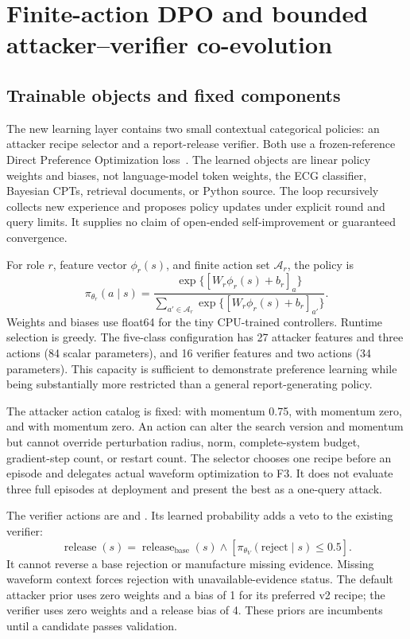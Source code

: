 \section{Finite-action DPO and bounded attacker--verifier co-evolution}
\label{sec:dpomethods}
\subsection{Trainable objects and fixed components}
The new learning layer contains two small contextual categorical policies: an attacker recipe selector and a report-release verifier. Both use a frozen-reference Direct Preference Optimization loss~\cite{dpo}. The learned objects are linear policy weights and biases, not language-model token weights, the ECG classifier, Bayesian CPTs, retrieval documents, or Python source. The loop recursively collects new experience and proposes policy updates under explicit round and query limits. It supplies no claim of open-ended self-improvement or guaranteed convergence.

For role $r$, feature vector $\phi_r(s)$, and finite action set $\mathcal A_r$, the policy is
\begin{equation}
 \pi_{\theta_r}(a\mid s)=
 \frac{\exp\{[W_r\phi_r(s)+b_r]_a\}}
 {\sum_{a'\in\mathcal A_r}\exp\{[W_r\phi_r(s)+b_r]_{a'}\}}.
\end{equation}
Weights and biases use float64 for the tiny CPU-trained controllers. Runtime selection is greedy. The five-class configuration has 27 attacker features and three actions (84 scalar parameters), and 16 verifier features and two actions (34 parameters). This capacity is sufficient to demonstrate preference learning while being substantially more restricted than a general report-generating policy.

The attacker action catalog is fixed:  with momentum 0.75,  with momentum zero, and  with momentum zero. An action can alter the search version and momentum but cannot override perturbation radius, norm, complete-system budget, gradient-step count, or restart count. The selector chooses one recipe before an episode and delegates actual waveform optimization to F3. It does not evaluate three full episodes at deployment and present the best as a one-query attack.

The verifier actions are  and . Its learned probability adds a veto to the existing verifier:
\begin{equation}
 \operatorname{release}(s)=\operatorname{release}_{\mathrm{base}}(s)
 \land \left[\pi_{\theta_V}(\mathrm{reject}\mid s)\leq0.5\right].
\end{equation}
It cannot reverse a base rejection or manufacture missing evidence. Missing waveform context forces rejection with unavailable-evidence status. The default attacker prior uses zero weights and a bias of 1 for its preferred v2 recipe; the verifier uses zero weights and a release bias of 4. These priors are incumbents until a candidate passes validation.

